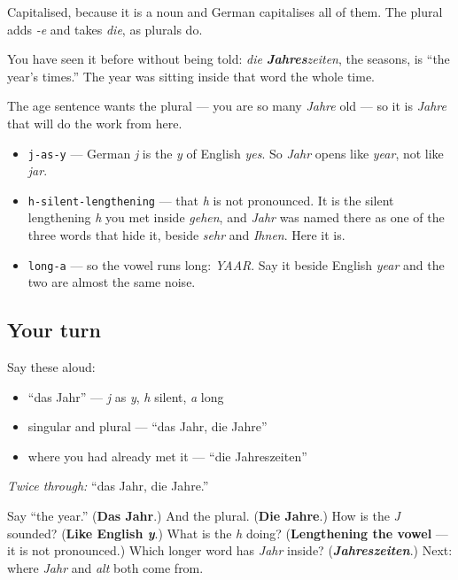 Capitalised, because it is a noun and German capitalises all of them. The plural adds \emph{-e} and takes \emph{die}, as plurals do.

You have seen it before without being told: \emph{die \textbf{Jahres}zeiten}, the seasons, is \textquotedblleft{}the year's times.\textquotedblright{} The year was sitting inside that word the whole time.

The age sentence wants the plural — you are so many \emph{Jahre} old — so it is \emph{Jahre} that will do the work from here.

\begin{sounds}
\begin{itemize}
\raggedright
  \item \texttt{j-as-y} — German \emph{j} is the \emph{y} of English \emph{yes}. So \emph{Jahr} opens like \emph{year}, not like \emph{jar}.
  \item \texttt{h-silent-lengthening} — that \emph{h} is not pronounced. It is the silent lengthening \emph{h} you met inside \emph{gehen}, and \emph{Jahr} was named there as one of the three words that hide it, beside \emph{sehr} and \emph{Ihnen}. Here it is.
  \item \texttt{long-a} — so the vowel runs long: \emph{YAAR}. Say it beside English \emph{year} and the two are almost the same noise.
\end{itemize}
\end{sounds}

\subsection*{Your turn}
Say these aloud:

\begin{itemize}
\raggedright
  \item \textquotedblleft{}das Jahr\textquotedblright{} — \emph{j} as \emph{y}, \emph{h} silent, \emph{a} long
  \item singular and plural — \textquotedblleft{}das Jahr, die Jahre\textquotedblright{}
  \item where you had already met it — \textquotedblleft{}die Jahreszeiten\textquotedblright{}
\end{itemize}

\emph{Twice through:} \textquotedblleft{}das Jahr, die Jahre.\textquotedblright{}

\begin{tcolorbox}[breakable,colback=teal!4,colframe=teal!35!black,title={Before you move on}]
Say \textquotedblleft{}the year.\textquotedblright{} (\textbf{Das Jahr}.) And the plural. (\textbf{Die Jahre}.) How is the \emph{J} sounded? (\textbf{Like English \emph{y}}.) What is the \emph{h} doing? (\textbf{Lengthening the vowel} — it is not pronounced.) Which longer word has \emph{Jahr} inside? (\emph{\textbf{Jahreszeiten}}.) Next: where \emph{Jahr} and \emph{alt} both come from.
\end{tcolorbox}
